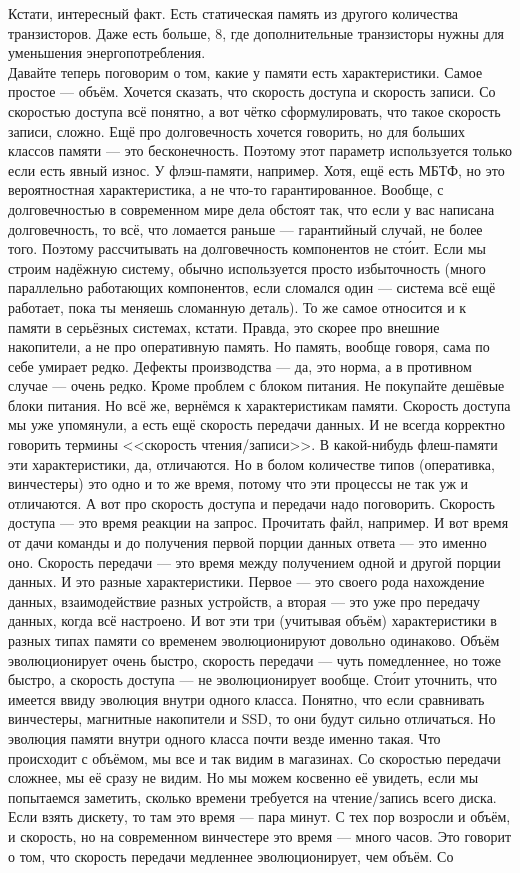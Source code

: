 \documentclass{article}
\begin{document}
    Кстати, интересный факт. Есть статическая память из другого количества транзисторов. Даже есть больше, 8, где дополнительные транзисторы нужны для уменьшения энергопотребления.\\
    Давайте теперь поговорим о том, какие у памяти есть характеристики. Самое простое --- объём. Хочется сказать, что скорость доступа и скорость записи. Со скоростью доступа всё понятно, а вот чётко сформулировать, что такое скорость записи, сложно. Ещё про долговечность хочется говорить, но для больших классов памяти --- это бесконечность. Поэтому этот параметр используется только если есть явный износ. У флэш-памяти, например. Хотя, ещё есть МБТФ, но это вероятностная характеристика, а не что-то гарантированное. Вообще, с долговечностью в современном мире дела обстоят так, что если у вас написана долговечность, то всё, что ломается раньше --- гарантийный случай, не более того. Поэтому рассчитывать на долговечность компонентов не ст\'{о}ит. Если мы строим надёжную систему, обычно используется просто избыточность (много параллельно работающих компонентов, если сломался один --- система всё ещё работает, пока ты меняешь сломанную деталь). То же самое относится и к памяти в серьёзных системах, кстати. Правда, это скорее про внешние накопители, а не про оперативную память. Но память, вообще говоря, сама по себе умирает редко. Дефекты производства --- да, это норма, а в противном случае --- очень редко. Кроме проблем с блоком питания. Не покупайте дешёвые блоки питания. Но всё же, вернёмся к характеристикам памяти. Скорость доступа мы уже упомянули, а есть ещё скорость передачи данных. И не всегда корректно говорить термины <<скорость чтения/записи>>. В какой-нибудь флеш-памяти эти характеристики, да, отличаются. Но в болом количестве типов (оперативка, винчестеры) это одно и то же время, потому что эти процессы не так уж и отличаются. А вот про скорость доступа и передачи надо поговорить. Скорость доступа --- это время реакции на запрос. Прочитать файл, например. И вот время от дачи команды и до получения первой порции данных ответа --- это именно оно. Скорость передачи --- это время между получением одной и другой порции данных. И это разные характеристики. Первое --- это своего рода нахождение данных, взаимодействие разных устройств, а вторая --- это уже про передачу данных, когда всё настроено. И вот эти три (учитывая объём) характеристики в разных типах памяти со временем эволюционируют довольно одинаково. Объём эволюционирует очень быстро, скорость передачи --- чуть помедленнее, но тоже быстро, а скорость доступа --- не эволюционирует вообще. Ст\'{о}ит уточнить, что имеется ввиду эволюция внутри одного класса. Понятно, что если сравнивать винчестеры, магнитные накопители и SSD, то они будут сильно отличаться. Но эволюция памяти внутри одного класса почти везде именно такая. Что происходит с объёмом, мы все и так видим в магазинах. Со скоростью передачи сложнее, мы её сразу не видим. Но мы можем косвенно её увидеть, если мы попытаемся заметить, сколько времени требуется на чтение/запись всего диска. Если взять дискету, то там это время --- пара минут. С тех пор возросли и объём, и скорость, но на современном винчестере это время --- много часов. Это говорит о том, что скорость передачи медленнее эволюционирует, чем объём. Со 
\end{document}
